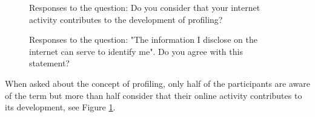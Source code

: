 
\begin{figure}
    \centering
    \caption{Responses to the question: Do you consider that your internet activity contributes to the development of profiling?}
    \label{fig:activity_contributes_profiling}
\end{figure}

\begin{figure}
    \centering
    \caption{Responses to the question: "The information I disclose on the internet can serve to identify me". Do you agree with this statement?}
    \label{fig:information_disclose_internet_identify_me}
\end{figure}

When asked about the concept of profiling, only half of the participants
are aware of the term but more than half consider that their online
activity contributes to its development, see Figure \ref*{fig:activity_contributes_profiling}.

